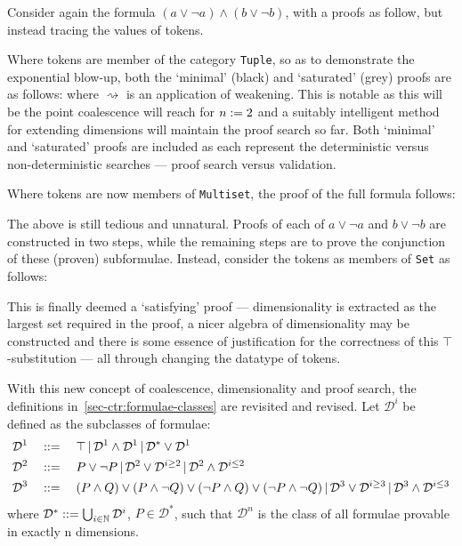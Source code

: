     \begin{examples}
        Consider again the formula $(a \vee \neg a) \wedge (b \vee \neg b)$, with a proofs as follow, but instead tracing the values of tokens.
        
        Where tokens are member of the category \texttt{Tuple}, so as to demonstrate the exponential blow-up, both the `minimal' (black) and `saturated' (grey) proofs are as follows:
         where $\rightsquigarrow$ is an application of weakening.
        This is notable as this will be the point coalescence will reach for $n := 2$ and a suitably intelligent method for extending dimensions will maintain the proof search so far.
        Both `minimal' and `saturated' proofs are included as each represent the deterministic versus non-deterministic searches --- proof search versus validation.

        Where tokens are now members of \texttt{Multiset}, the proof of the full formula follows:
        
        The above is still tedious and unnatural.
        Proofs of each of $a \vee \neg a$ and $b \vee \neg b$ are constructed in two steps, while the remaining steps are to prove the conjunction of these (proven) subformulae.
        Instead, consider the tokens as members of \texttt{Set} as follows:

        
        This is finally deemed a `satisfying' proof --- dimensionality is extracted as the largest set required in the proof, a nicer algebra of dimensionality may be constructed and there is some essence of justification for the correctness of this $\top$-substitution --- all through changing the datatype of tokens.
    \end{examples}

    \begin{definition*}
        With this new concept of coalescence, dimensionality and proof search, the definitions in~\ref{sec-ctr:formulae-classes} are revisited and revised.
        Let $\mathcal{D}^i$ be defined as the subclasses of formulae:
        \begin{align*}
            \mathcal{D}^1 \quad &::= \quad \top \,|\, \mathcal{D}^1 \wedge \mathcal{D}^1 \,|\, \mathcal{D}^* \vee \mathcal{D}^1 \\
            \mathcal{D}^2 \quad &::= \quad P \vee \neg P \,|\, \mathcal{D}^2 \vee \mathcal{D}^{i \geq 2} \,|\, \mathcal{D}^2 \wedge \mathcal{D}^{i \leq 2} \\
            \mathcal{D}^3 \quad &::= \quad (P \wedge Q) \vee (P \wedge \neg Q) \vee (\neg P \wedge Q) \vee (\neg P \wedge \neg Q) \,|\, \mathcal{D}^3 \vee \mathcal{D}^{i \geq 3} \,|\, \mathcal{D}^3 \wedge \mathcal{D}^{i \leq 3}
        \end{align*}
        where $\mathcal{D}^* ::= \bigcup_{i \in \mathbb{N}} \mathcal{D}^i$, $P \in \mathcal{D}^*$, such that $\mathcal{D}^n$ is the class of all formulae provable in exactly n dimensions.
    \end{definition*}
    
